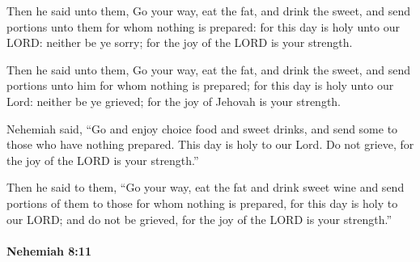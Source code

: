 			Then he said unto them, Go your way, eat the fat, and drink the sweet, and send portions unto them for whom nothing is prepared: for this day is holy unto our LORD: neither be ye sorry; for the joy of the LORD is your strength.

			\begin{versebox}
					\item[BHS] 
					\item[LXX] 
					\item[ASV] Then he said unto them, Go your way, eat the fat, and drink the sweet, and send portions unto him for whom nothing is prepared; for this day is holy unto our Lord: neither be ye grieved; for the joy of Jehovah is your strength.
					\item[NIV] Nehemiah said, “Go and enjoy choice food and sweet drinks, and send some to those who have nothing prepared. This day is holy to our Lord. Do not grieve, for the joy of the LORD is your strength.”
					\item[NRSV] Then he said to them, “Go your way, eat the fat and drink sweet wine and send portions of them to those for whom nothing is prepared, for this day is holy to our LORD; and do not be grieved, for the joy of the LORD is your strength.”
			\end{versebox}

		\paragraph{Nehemiah 8:11} %
			\label{NEHEMIAH-8-11}

